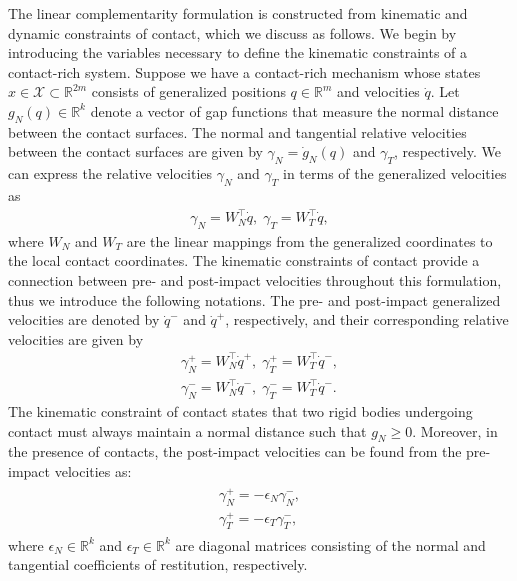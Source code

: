 %
The linear complementarity formulation is constructed from kinematic and dynamic
constraints of contact, which we discuss as follows.
%
We begin by introducing the variables necessary to define the kinematic
constraints of a contact-rich system.
%
Suppose we have a contact-rich mechanism whose states $x \in \mathcal{X} \subset
\mathbb{R}^{2m}$ consists of generalized positions $q \in \mathbb{R}^m$ and
velocities $\dot{q}$.
%
Let $g_N(q) \in \mathbb{R}^{k}$ denote a vector of gap functions that measure
the normal distance between the contact surfaces. 
%
The normal and tangential relative velocities between the contact surfaces are
given by $\gamma_N = \dot{g}_N(q)$ and $\gamma_T$, respectively.
%
We can express the relative velocities $\gamma_N$ and $\gamma_T$ in terms of the
generalized velocities as 
%
\begin{align}
  \gamma_N = W_N^\top \dot{q}, \; \gamma_T = W_T^\top \dot{q},
  \label{eq:gamma}
\end{align}  
\noindent where $W_N$ and $W_T$ are the linear mappings from the generalized
coordinates to the local contact coordinates.
%
The kinematic constraints of contact provide a connection between pre- and
post-impact velocities throughout this formulation, thus we introduce the
following notations.
%
The pre- and post-impact generalized velocities are denoted by $\dot{q}^-$ and
$\dot{q}^+$, respectively, and their corresponding relative velocities are given
by
\begin{align*}
  \gamma_N^+ = W_N^\top \dot{q}^+, \; \gamma_T^+ = W_T^\top \dot{q}^-, \\
  \gamma_N^- = W_N^\top \dot{q}^-, \; \gamma_T^- = W_T^\top \dot{q}^-.
\end{align*}
%
The kinematic constraint of contact states that two rigid bodies undergoing
contact must always maintain a normal distance such that $g_N \geq 0$. Moreover,
in the presence of contacts, the post-impact velocities can be found from the
pre-impact velocities as:
\begin{align}
  \begin{gathered}
    \gamma_N^+ = -\epsilon_N \gamma_N^-, \\
    \gamma_T^+ = -\epsilon_T \gamma_T^-,
  \end{gathered}
  \label{eq:postimpactVel}
\end{align}
\noindent where $\epsilon_N \in \mathbb{R}^k$ and $\epsilon_T \in \mathbb{R}^k$
are diagonal matrices consisting of the normal and tangential coefficients of
restitution, respectively.

